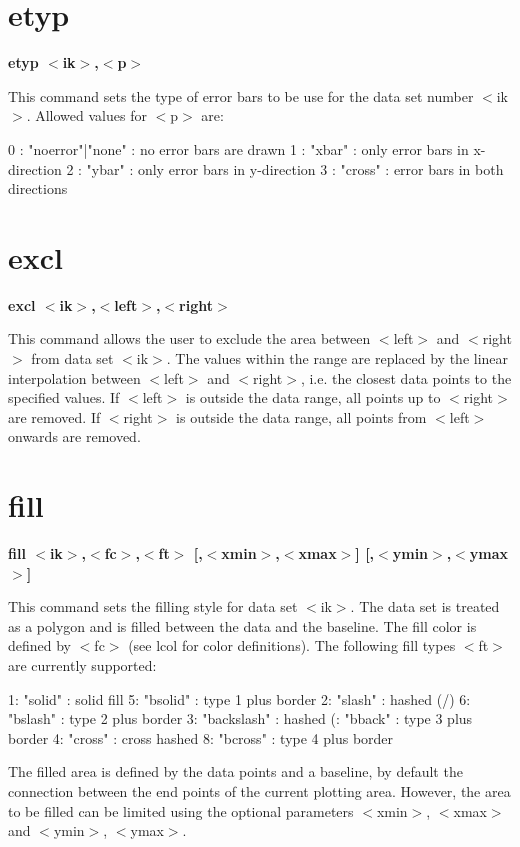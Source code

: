 \section{etyp}
{\bf etyp $ <$ik$> $,$ <$p$> $ \par }
\par
\vspace{3pt}
This command sets the type of error bars to be use for the data 
set number $ <$ik$> $. Allowed values for $ <$p$> $ are: 
\par
\begin{MacVerbatim}
  0 : {"noerror"|"none"} : no error bars are drawn
  1 :  "xbar"            : only error bars in x-direction
  2 :  "ybar"            : only error bars in y-direction
  3 :  "cross"           : error bars in both directions
\end{MacVerbatim}
\section{excl}
{\bf excl $ <$ik$> $,$ <$left$> $,$ <$right$> $ \par }
\par
\vspace{3pt}
This command allows the user to exclude the area between $ <$left$> $ 
and $ <$right$> $ from data set $ <$ik$> $. The values within the range 
are replaced by the linear interpolation between $ <$left$> $ and 
$ <$right$> $, i.e. the closest data points to the specified values. 
If $ <$left$> $ is outside the data range, all points up to $ <$right$> $ 
are removed. If $ <$right$> $ is outside the data range, all points 
from $ <$left$> $ onwards are removed. 
\section{fill}
{\bf fill $ <$ik$> $,$ <$fc$> $,$ <$ft$> $ [,$ <$xmin$> $,$ <$xmax$> $] [,$ <$ymin$> $,$ <$ymax$> $] \par }
\par
\vspace{3pt}
This command sets the filling style for data set $ <$ik$> $. The data 
set is treated as a polygon and is filled between the data and 
the baseline. The fill color is defined by $ <$fc$> $ (see lcol for 
color definitions). The following fill types $ <$ft$> $ are currently 
supported: 
\par
\begin{MacVerbatim}
  1: "solid"     : solid fill    5: "bsolid" : type 1 plus border
  2: "slash"     : hashed (/)    6: "bslash" : type 2 plus border
  3: "backslash" : hashed (: "bback"  : type 3 plus border
  4: "cross"     : cross hashed  8: "bcross" : type 4 plus border
\end{MacVerbatim}
The filled area is defined by the data points and a baseline, 
by default the connection between the end points of the current 
plotting area. However, the area to be filled can be limited 
using the optional parameters $ <$xmin$> $, $ <$xmax$> $ and $ <$ymin$> $, $ <$ymax$> $. 
